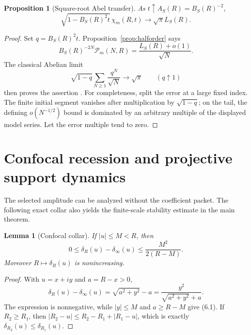 \documentclass[11pt]{article}
\newtheorem{proposition}[theorem]{Proposition}
\newtheorem{lemma}[theorem]{Lemma}
\theoremstyle{remark}
\begin{document}
\begin{proposition}[Square-root Abel transfer]
\label{prop:abel}
As $t\uparrow A_S(R)=B_S(R)^{-2}$,
\[
 \sqrt{1-B_S(R)^2t}\,\chi_m(R,t)
 \longrightarrow\sqrt\pi L_S(R).
\]
\end{proposition}

\begin{proof}
Set $q=B_S(R)^2t$.  Proposition~\ref{prop:halforder} says
\[
 B_S(R)^{-2N}\mathcal P_m(N,R)=\frac{L_S(R)+o(1)}{\sqrt N}.
\]
The classical Abelian limit
\[
 \sqrt{1-q}\sum_{N\ge1}\frac{q^N}{\sqrt N}\longrightarrow\sqrt\pi
 \qquad(q\uparrow1)
\]
then proves the assertion \cite{HardyDivergentSeries}.  For completeness, split the error at a
large fixed index.  The finite initial segment vanishes after multiplication by $\sqrt{1-q}$;
on the tail, the defining $o(N^{-1/2})$ bound is dominated by an arbitrary multiple of the
displayed model series.  Let the error multiple tend to zero.
\end{proof}

\section{Confocal recession and projective support dynamics}
\label{sec:projective}

The selected amplitude can be analyzed without the coefficient packet.  The following exact
collar also yields the finite-scale stability estimate in the main theorem.

\begin{lemma}[Confocal collar]
\label{lem:collar}
If $|u|\le M<R$, then
\begin{equation}
 0\le\delta_R(u)-\delta_\infty(u)
 \le\frac{M^2}{2(R-M)}.
 \tag{6.1}
\end{equation}
Moreover $R\mapsto\delta_R(u)$ is nonincreasing.
\end{lemma}

\begin{proof}
With $u=x+iy$ and $a=R-x>0$,
\[
 \delta_R(u)-\delta_\infty(u)
 =\sqrt{a^2+y^2}-a
 =\frac{y^2}{\sqrt{a^2+y^2}+a}.
\]
The expression is nonnegative, while $|y|\le M$ and $a\ge R-M$ give (6.1).  If $R_2\ge R_1$,
then
$|R_2-u|\le R_2-R_1+|R_1-u|$, which is exactly
$\delta_{R_2}(u)\le\delta_{R_1}(u)$.
\end{proof}
\end{document}
